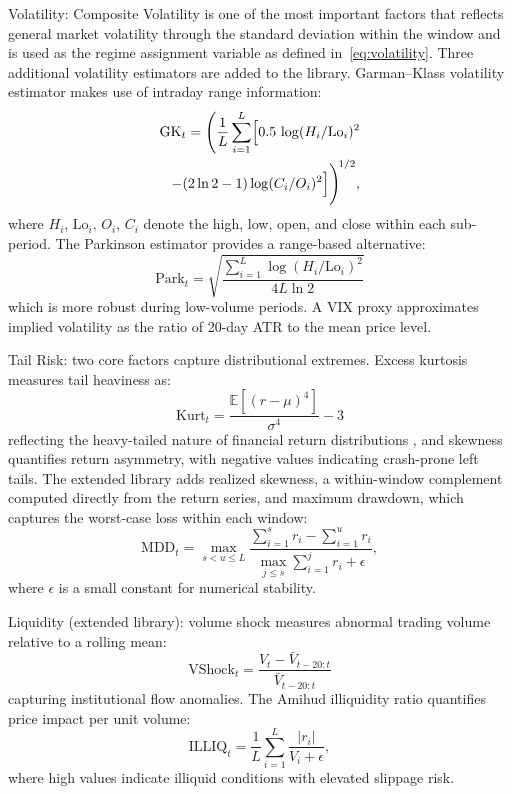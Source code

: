 \documentclass[]{interact}
\begin{document}
Volatility: Composite Volatility is one of the most important factors that reflects general market volatility through the standard deviation within the window and is used as the regime assignment variable as defined in~\eqref{eq:volatility}. Three additional volatility estimators are added to the library. Garman--Klass volatility estimator makes use of intraday range information:
\begin{equation}
\begin{split}
    \text{GK}_t = \Biggl(\frac{1}{L}\sum_{i=1}^{L}\Bigl[0.5\,\log(H_i/\mathrm{Lo}_i)^2 \\
    - (2\ln 2 - 1)\log(C_i/O_i)^2\Bigr]\Biggr)^{\!1/2},
\end{split}
\label{eq:garman_klass}
\end{equation}
where $H_i$, $\mathrm{Lo}_i$, $O_i$, $C_i$ denote the high, low, open, and close within each sub-period. The Parkinson estimator \citep{parkinson1980extreme} provides a range-based alternative:
\begin{equation}
    \text{Park}_t = \sqrt{ \frac{\sum_{i=1}^{L} \log(H_i/\mathrm{Lo}_i)^2}{4L\ln 2} }
\end{equation}
which is more robust during low-volume periods. A VIX proxy approximates implied volatility as the ratio of 20-day ATR to the mean price level.

Tail Risk: two core factors capture distributional extremes. Excess kurtosis measures tail heaviness as:
\begin{equation}
    \text{Kurt}_t = \frac{\mathbb{E}[(r-\mu)^4]}{\sigma^4} - 3
\end{equation}
reflecting the heavy-tailed nature of financial return distributions \citep{bouchaud2001more}, and skewness quantifies return asymmetry, with negative values indicating crash-prone left tails. The extended library adds realized skewness, a within-window complement computed directly from the return series, and maximum drawdown, which captures the worst-case loss within each window:
\begin{equation}
    \text{MDD}_t = \max_{s < u \le L} \frac{\sum_{i=1}^{s} r_i - \sum_{i=1}^{u} r_i}{\max_{j \le s} \sum_{i=1}^{j} r_i + \epsilon},
    \label{eq:max_drawdown}
\end{equation}
where $\epsilon$ is a small constant for numerical stability.

Liquidity (extended library): volume shock measures abnormal trading volume relative to a rolling mean:
\begin{equation}
    \text{VShock}_t = \frac{V_t - \bar{V}_{t-20:t}}{\bar{V}_{t-20:t}}
\end{equation}
capturing institutional flow anomalies. The Amihud illiquidity ratio \citep{amihud2002illiquidity} quantifies price impact per unit volume:
\begin{equation}
    \text{ILLIQ}_t = \frac{1}{L} \sum_{i=1}^{L} \frac{|r_i|}{V_i + \epsilon},
    \label{eq:amihud}
\end{equation}
where high values indicate illiquid conditions with elevated slippage risk.
\end{document}
